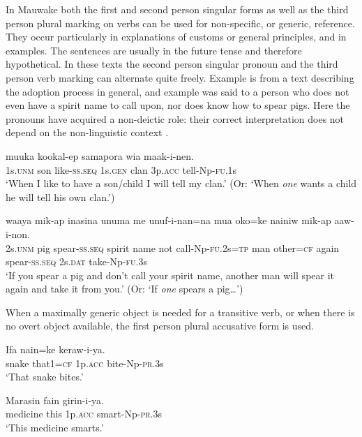 In Mauwake both the first and second person singular forms as well as the third person plural marking on verbs can be used for non-specific, or generic, reference. They occur particularly in explanations of customs or general principles, and in examples. The sentences are usually in the future tense and therefore hypothetical. In these texts the second person singular pronoun and the third person verb marking can alternate quite freely. Example  is from a text describing the adoption process in general, and example  was said to a person who does not even have a spirit name to call upon, nor does know how to spear pigs. Here the pronouns have acquired a non-deictic role: their correct interpretation does not depend on the non-linguistic context \citep[260]{AndersonEtAl1985}%
.

\ea%
\label{ex:3:x621}
\gll {} muuka kookal-ep  samapora wia maak-i-nen.\\
1s.\textsc{unm} son like-\textsc{ss}.\textsc{seq} 1s.\textsc{gen} clan 3p.\textsc{acc} tell-Np-\textsc{fu}.1s\\
\glt`When I like to have a son/child I will tell my clan.' (Or: `When \textit{one} wants a child he will tell his own clan.')
\z

\ea%
\label{ex:3:x622}
\gll {} waaya mik-ap inasina unuma me unuf-i-nan=na mua oko=ke nainiw mik-ap  aaw-i-non.\\
2s.\textsc{unm} pig spear-\textsc{ss}.\textsc{seq} spirit name not call-Np-\textsc{fu}.2s=\textsc{tp} man other=\textsc{cf} again spear-\textsc{ss}.\textsc{seq} 2s.\textsc{dat} take-Np-\textsc{fu}.3s\\
\glt`If you spear a pig and don't call your spirit name, another man will spear it again and take it from you.' (Or: `If \textit{one} spears a pig{\dots}')
\z

When a maximally generic object is needed for a transitive verb, or when there is no overt object available, the first person plural accusative form is used. 

\ea%
\label{ex:3:x623}
\gll Ifa nain=ke  keraw-i-ya. \\
snake that1=\textsc{cf} 1p.\textsc{acc} bite-Np-\textsc{pr}.3s\\
\glt`That snake bites.'
\z

\ea%
\label{ex:3:x624}
\gll Marasin fain  girin-i-ya. \\
medicine this 1p.\textsc{acc} smart-Np-\textsc{pr}.3s\\
\glt`This medicine smarts.'
\z

